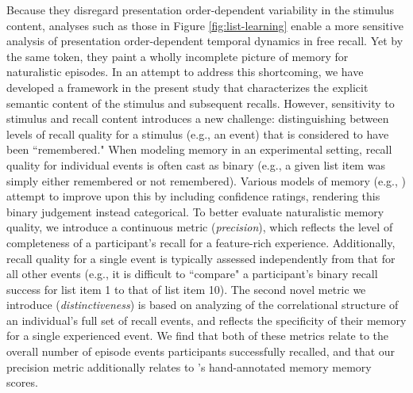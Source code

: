 \documentclass{article}
\begin{document}
Because they disregard presentation order-dependent variability in the stimulus content, analyses such as those in Figure \ref{fig:list-learning} enable a more sensitive analysis of presentation order-dependent temporal dynamics in free recall. Yet by the same token, they paint a wholly incomplete picture of memory for naturalistic episodes.  In an attempt to address this shortcoming, we have developed a framework in the present study that characterizes the explicit semantic content of the stimulus and subsequent recalls.  However, sensitivity to stimulus and recall content introduces a new challenge: distinguishing between levels of recall quality for a stimulus (e.g., an event) that is considered to have been ``remembered."  When modeling memory in an experimental setting, recall quality for individual events is often cast as binary (e.g., a given list item was simply either remembered or not remembered).  Various models of memory (e.g., \citealp{Yone02}) attempt to improve upon this by including confidence ratings, rendering this binary judgement instead categorical.  To better evaluate naturalistic memory quality, we introduce a continuous metric (\textit{precision}), which reflects the level of completeness of a participant's recall for a feature-rich experience.  Additionally, recall quality for a single event is typically assessed independently from that for all other events (e.g., it is difficult to ``compare" a participant's binary recall success for list item 1 to that of list item 10).  The second novel metric we introduce (\textit{distinctiveness}) is based on analyzing of the correlational structure of an individual's full set of recall events, and reflects the specificity of their memory for a single experienced event.  We find that both of these metrics relate to the overall number of episode events participants successfully recalled, and that our precision metric additionally relates to \cite{ChenEtal17}'s hand-annotated memory memory scores.
\end{document}
